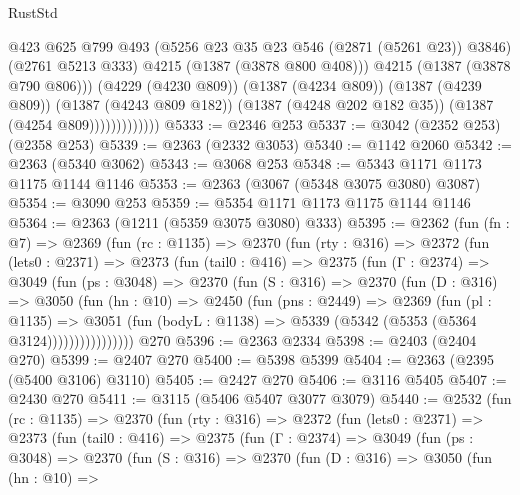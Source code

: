 \begin{lexlean}{RustStd}
\begin{coremodule}
                              @423
                              @625
                              @799
                              @493
                              (@5256 @23 @35 @23 @546 (@2871 (@5261 @23)) @3846)
                              (@2761 @5213 @333)
                              @4215
                              (@1387 (@3878 @800 @408)))
                            @4215
                            (@1387 (@3878 @790 @806)))
                          (@4229 (@4230 @809))
                          (@1387 (@4234 @809))
                          (@1387 (@4239 @809))
                          (@1387 (@4243 @809 @182))
                          (@1387 (@4248 @202 @182 @35))
                          (@1387 (@4254 @809)))))))))))))
@5333 := @2346 @253
@5337 := @3042 (@2352 @253) (@2358 @253)
@5339 := @2363 (@2332 @3053)
@5340 := @1142 @2060
@5342 := @2363 (@5340 @3062)
@5343 := @3068 @253
@5348 := @5343 @1171 @1173 @1175 @1144 @1146
@5353 := @2363 (@3067 (@5348 @3075 @3080) @3087)
@5354 := @3090 @253
@5359 := @5354 @1171 @1173 @1175 @1144 @1146
@5364 := @2363 (@1211 (@5359 @3075 @3080) @333)
@5395 := @2362
    (fun (fn : @7) =>
    @2369
      (fun (rc : @1135) =>
      @2370
        (fun (rty : @316) =>
        @2372
          (fun (lets0 : @2371) =>
          @2373
            (fun (tail0 : @416) =>
            @2375
              (fun (Γ : @2374) =>
              @3049
                (fun (ps : @3048) =>
                @2370
                  (fun (S : @316) =>
                  @2370
                    (fun (D : @316) =>
                    @3050
                      (fun (hn : @10) =>
                      @2450
                        (fun (pns : @2449) =>
                        @2369
                          (fun (pl : @1135) =>
                          @3051
                            (fun (bodyL : @1138) => @5339 (@5342 (@5353 (@5364 @3124))))))))))))))))
    @270
@5396 := @2363 @2334
@5398 := @2403 (@2404 @270)
@5399 := @2407 @270
@5400 := @5398 @5399
@5404 := @2363 (@2395 (@5400 @3106) @3110)
@5405 := @2427 @270
@5406 := @3116 @5405
@5407 := @2430 @270
@5411 := @3115 (@5406 @5407 @3077 @3079)
@5440 := @2532
    (fun (rc : @1135) =>
    @2370
      (fun (rty : @316) =>
      @2372
        (fun (lets0 : @2371) =>
        @2373
          (fun (tail0 : @416) =>
          @2375
            (fun (Γ : @2374) =>
            @3049
              (fun (ps : @3048) =>
              @2370
                (fun (S : @316) =>
                @2370
                  (fun (D : @316) =>
                  @3050
                    (fun (hn : @10) =>

\end{coremodule}
\end{lexlean}
